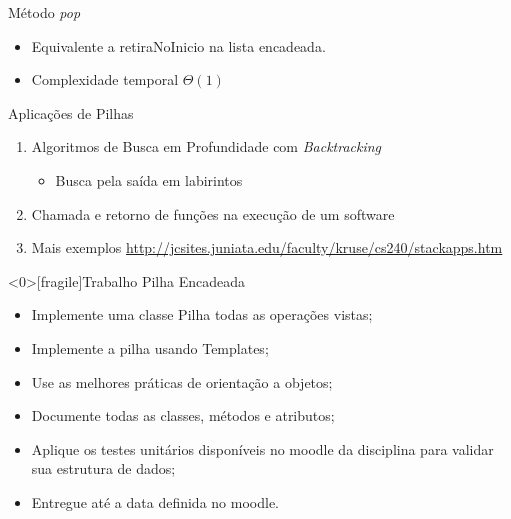 \documentclass[12pt,table,xcolor={dvipsnames}]{beamer}
\begin{document}
\begin{frame}[fragile]{Método \textit{pop}}
	\begin{itemize}
		\item Equivalente a retiraNoInicio na lista encadeada.
		\item Complexidade temporal $\Theta(1)$
	\end{itemize}	
\end{frame}	

\begin{frame}[fragile]{Aplicações de Pilhas}
\begin{enumerate}
	\item Algoritmos de Busca em Profundidade com \textit{Backtracking} 
	\begin{itemize}
		\item Busca pela saída em labirintos
	\end{itemize}
	\item Chamada e retorno de funções na execução de um software
	\item Mais exemplos \tiny\url{http://jcsites.juniata.edu/faculty/kruse/cs240/stackapps.htm}
\end{enumerate}
\end{frame}

\begin{frame}<0>[fragile]{Trabalho Pilha Encadeada}
\begin{itemize}
\item Implemente uma classe Pilha todas as operações vistas;
\item Implemente a pilha usando Templates;
\item Use as melhores práticas de orientação a objetos;
\item Documente todas as classes, métodos e atributos;
\item Aplique os testes unitários disponíveis no moodle da disciplina para validar sua estrutura de dados;
\item Entregue até a data definida no moodle.
\end{itemize}
\end{frame}
\end{document}
